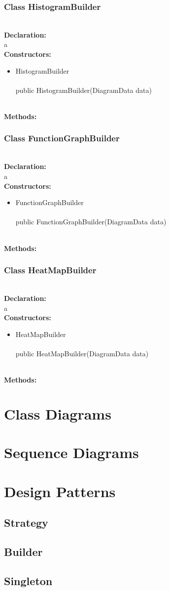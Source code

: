 \documentclass[10pt,a4paper]{report}
\newcommand{\public}{\textcolor{col:public}{public }}
\newcommand{\type}[1]{\textcolor{col:class}{#1}}
\newcommand{\constrdesc}[3]{
#2
\leavevmode \\
\leavevmode \\
#1#2(#3)
}
\newcommand{\desc}[3]{
    #1{#2 #3}
}
\newcommand{\classdesc}[4]{
    \desc{\subsection}{Class}{#1} \leavevmode \\
    \textbf{Declaration:} \leavevmode \\
    #2 \leavevmode \\
    \textbf{Constructors:} \leavevmode \\
    #3 \leavevmode \\
    \textbf{Methods:} \leavevmode \\
    #4
}
\newcommand{\patternentry}[2]{
    #1{#2}
}
\newcommand{\pattern}[1]{
    \patternentry{\section}{#1}
}
\begin{document}
\classdesc{HistogramBuilder}{a}{
    \begin{itemize}
        \item \constrdesc{\public}{HistogramBuilder}{\type{DiagramData} data}
    \end{itemize}
}{}

\classdesc{FunctionGraphBuilder}{a}{
    \begin{itemize}
        \item \constrdesc{\public}{FunctionGraphBuilder}{\type{DiagramData} data}
    \end{itemize}
}{}
\classdesc{HeatMapBuilder}{a}{
    \begin{itemize}
        \item \constrdesc{\public}{HeatMapBuilder}{\type{DiagramData} data}
    \end{itemize}
}{}
\chapter{Class Diagrams}

\chapter{Sequence Diagrams}

\chapter{Design Patterns}
\pattern{Strategy}
\pattern{Builder}
\pattern{Singleton}
\end{document}
